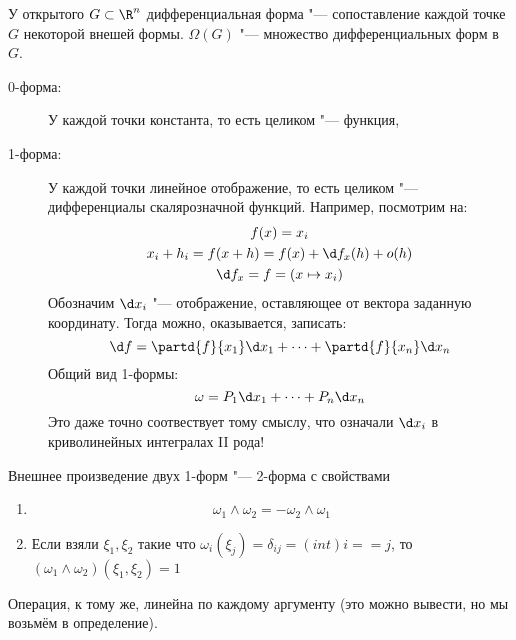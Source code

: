 \begin{Def}
	У открытого $G \subset \R^n$ дифференциальная форма "--- сопоставление каждой точке $G$ некоторой внешей формы.
	$\Omega(G)$ "--- множество дифференциальных форм в $G$.
\end{Def}
\begin{exmp}\begin{description}
\item[0-форма:]
	У каждой точки константа, то есть целиком "--- функция,

\item[1-форма:]
	У каждой точки линейное отображение, то есть целиком "--- дифференциалы скалярозначной функций.
	Например, посмотрим на:
	\begin{gather*}
		f(x) = x_i \\
		x_i + h_i = f(x + h) = f(x) + \d f_x(h) + o(h) \\
		\d f_x = f = (x \mapsto x_i)
	\end{gather*}
	Обозначим $\d x_i$ "--- отображение, оставляющее от вектора заданную координату.
	Тогда можно, оказывается, записать:
	\[ \d f = \partd{f}{x_1} \d x_1 + \dots + \partd{f}{x_n} \d x_n \]
	Общий вид 1-формы:
	\[ \omega = P_1 \d x_1 + \dots + P_n \d x_n \]
	Это даже точно соотвествует тому смыслу, что означали $\d x_i$ в криволинейных интегралах II рода!
\end{description}\end{exmp}

\begin{Def}
	Внешнее произведение двух 1-форм "--- 2-форма с свойствами
	\begin{enumerate}
	\item
		\[ \omega_1 \wedge \omega_2 = - \omega_2 \wedge \omega_1 \]
	
	\item
		Если взяли $\xi_1, \xi_2$ такие что $\omega_i(\xi_j) = \delta_{ij} = (int) i == j$, 
		то $(\omega_1 \wedge \omega_2)(\xi_1, \xi_2) = 1$
	\end{enumerate}
	Операция, к тому же, линейна по каждому аргументу (это можно вывести, но мы возьмём в определение).
\end{Def}

